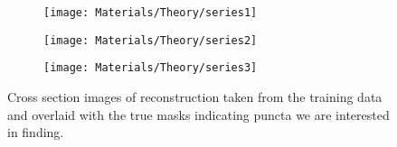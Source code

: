 \begin{figure}
	\centering
	\begin{subfigure}[b]{0.2\linewidth}
		\centering
		\texttt{[image: Materials/Theory/series1]}
	\end{subfigure}
	\qquad
	\begin{subfigure}[b]{0.2\linewidth}
		\centering
		\texttt{[image: Materials/Theory/series2]}
	\end{subfigure}
	\qquad
	\begin{subfigure}[b]{0.2\linewidth}
		\centering
		\texttt{[image: Materials/Theory/series3]}
	\end{subfigure}
	\caption{Cross section images of reconstruction taken from the training data and overlaid with the true masks indicating puncta we are interested in finding.}
	\label{puncta}
\end{figure}